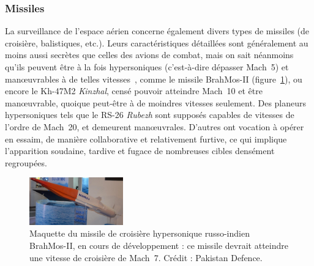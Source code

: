 	\addtocounter{footnote}{1}

	\addtocounter{footnote}{1}	
	
	\subsubsection{Missiles}
	La surveillance de l'espace aérien concerne également divers types de missiles (de croisière, balistiques, etc.). Leurs caractéristiques détaillées sont généralement au moins aussi secrètes que celles des avions de combat, mais on sait néanmoins qu'ils peuvent être à la fois hypersoniques (c'est-à-dire dépasser Mach~5) et manœuvrables à de telles vitesses~\cite{missiles}, comme le missile BrahMos-II (figure~\ref{fig:brahmos}), ou encore le Kh-47M2 \emph{Kinzhal}, censé pouvoir atteindre Mach~10\footnotemark{} et être manœuvrable, quoique peut-être  à de moindres vitesses seulement. Des planeurs hypersoniques tels que le RS-26 \emph{Rubezh} sont supposés capables de vitesses de l'ordre de Mach~20, et demeurent manœuvrales.\footnotemark{} D'autres ont vocation à opérer en essaim, de manière collaborative et relativement furtive, ce qui implique l'apparition soudaine, tardive et fugace de nombreuses cibles densément regroupées.\footnotemark{}

	\addtocounter{footnote}{-2}
	
	\addtocounter{footnote}{1}

	\addtocounter{footnote}{1}
	
	\begin{figure}
		\centering
		\includegraphics[width=0.36\textwidth]{figures/ch1/brahmos-II}
		\caption[Missile hypersonique BrahMos-II]{Maquette du missile de croisière hypersonique russo-indien BrahMos-II, en cours de développement : ce missile devrait atteindre une vitesse de croisière de Mach~7.\footnotemark{} Crédit : Pakistan Defence.}
		\label{fig:brahmos}
	\end{figure}
	
